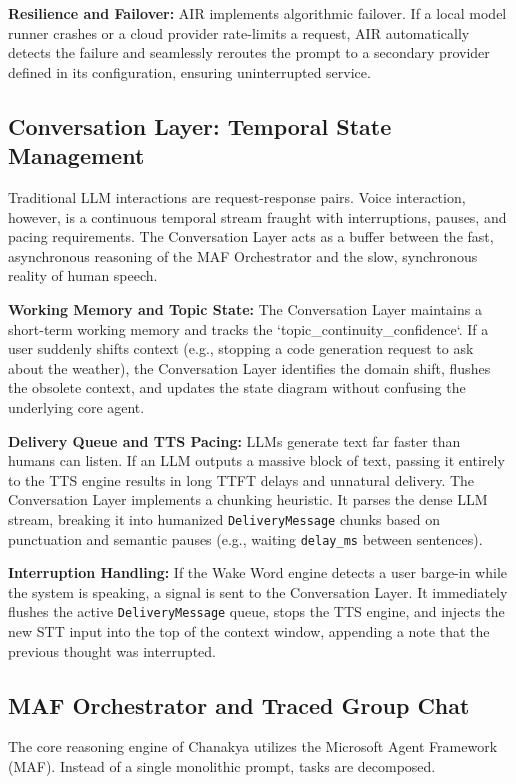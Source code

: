 \documentclass[conference]{IEEEtran}
\begin{document}
\textbf{Resilience and Failover:} AIR implements algorithmic failover. If a local model runner crashes or a cloud provider rate-limits a request, AIR automatically detects the failure and seamlessly reroutes the prompt to a secondary provider defined in its configuration, ensuring uninterrupted service.

\subsection{Conversation Layer: Temporal State Management}
Traditional LLM interactions are request-response pairs. Voice interaction, however, is a continuous temporal stream fraught with interruptions, pauses, and pacing requirements. The Conversation Layer acts as a buffer between the fast, asynchronous reasoning of the MAF Orchestrator and the slow, synchronous reality of human speech.

\textbf{Working Memory and Topic State:} The Conversation Layer maintains a short-term working memory and tracks the `topic\_continuity\_confidence`. If a user suddenly shifts context (e.g., stopping a code generation request to ask about the weather), the Conversation Layer identifies the domain shift, flushes the obsolete context, and updates the state diagram without confusing the underlying core agent.

\textbf{Delivery Queue and TTS Pacing:} LLMs generate text far faster than humans can listen. If an LLM outputs a massive block of text, passing it entirely to the TTS engine results in long TTFT delays and unnatural delivery. The Conversation Layer implements a chunking heuristic. It parses the dense LLM stream, breaking it into humanized \texttt{DeliveryMessage} chunks based on punctuation and semantic pauses (e.g., waiting \texttt{delay\_ms} between sentences).

\textbf{Interruption Handling:} If the Wake Word engine detects a user barge-in while the system is speaking, a signal is sent to the Conversation Layer. It immediately flushes the active \texttt{DeliveryMessage} queue, stops the TTS engine, and injects the new STT input into the top of the context window, appending a note that the previous thought was interrupted.

\subsection{MAF Orchestrator and Traced Group Chat}
The core reasoning engine of Chanakya utilizes the Microsoft Agent Framework (MAF). Instead of a single monolithic prompt, tasks are decomposed.
\end{document}
